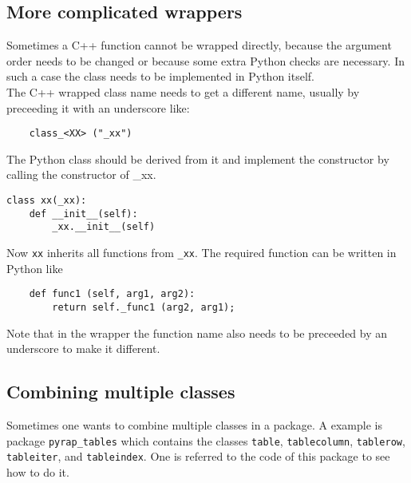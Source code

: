 \subsection{More complicated wrappers}
Sometimes a C++ function cannot be wrapped directly, because the argument
order needs to be changed or because some extra Python checks are
necessary.
In such a case the class needs to be implemented in Python itself.
\\The C++ wrapped class name needs to get a different name,
usually by preceeding it with an underscore like:
\begin{verbatim}
    class_<XX> ("_xx")
\end{verbatim}
The Python class should be derived from it and implement the
constructor by calling the constructor of \_xx.
\begin{verbatim}
class xx(_xx):
    def __init__(self):
        _xx.__init__(self)
\end{verbatim}
Now \texttt{xx} inherits all functions from \texttt{\_xx}.
The required function can be written in Python like
\begin{verbatim}
    def func1 (self, arg1, arg2):
        return self._func1 (arg2, arg1);
\end{verbatim}
Note that in the wrapper the function name also needs to be
preceeded by an underscore to make it different.

\subsection{Combining multiple classes}
Sometimes one wants to combine multiple classes in a package. A
example is package \texttt{pyrap\_tables} which contains the classes
\texttt{table}, \texttt{tablecolumn}, \texttt{tablerow},
\texttt{tableiter}, and \texttt{tableindex}. One is referred to the
code of this package to see how
to do it.

